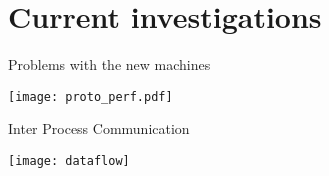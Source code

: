 \section{Current investigations}

\begin{frame}{Problems with the new machines}{}
	\begin{center} 
		\texttt{[image: proto\_perf.pdf]}
	\end{center} 
\end{frame}

\begin{frame}{Inter Process Communication}{}
	\begin{center} 
		\texttt{[image: dataflow]}
	\end{center} 
\end{frame}
